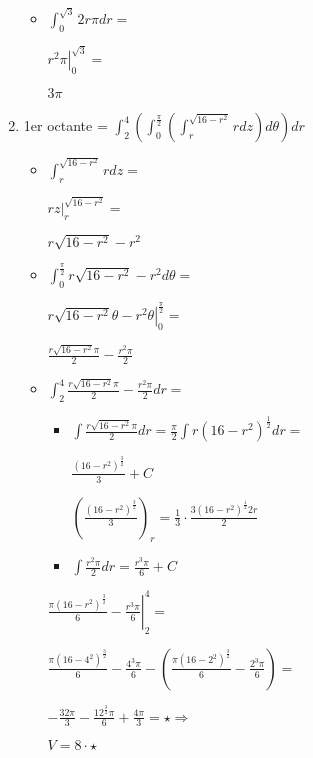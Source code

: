 \documentclass[../practica_09.tex]{subfiles}
\begin{document}
\begin{enumerate}
\begin{itemize}
                \item $\int_0^{\sqrt{3}} 2r\pi dr =$
                
                    $\left. r^2\pi \right |_0^{\sqrt{3}} =$

                    $ 3\pi $

            \end{itemize}

        \item 1er octante = $ \int_2^4 (\int_0^{\frac{\pi}{2}} (\int_r^{\sqrt{16-r^2}} r dz ) d\theta) dr $

            \begin{itemize}
                \item $ \int_r^{\sqrt{16-r^2}} r dz = $
                
                    $\left. rz \right |_r^{\sqrt{16-r^2}} = $

                    $ r\sqrt{16-r^2} - r^2 $

                \item $ \int_0^{\frac{\pi}{2}} r\sqrt{16-r^2} - r^2 d\theta = $
                
                    $\left. r\sqrt{16-r^2}\theta - r^2\theta \right |_0^{\frac{\pi}{2}} = $

                    $\frac{r\sqrt{16-r^2}\pi}{2} - \frac{r^2\pi}{2}$

                \item $\int_2^4 \frac{r\sqrt{16-r^2}\pi}{2} - \frac{r^2\pi}{2} dr = $
                
                    \begin{itemize}
                        \item $\int \frac{r\sqrt{16-r^2}\pi}{2} dr = \frac{\pi}{2} \int r(16-r^2)^{\frac{1}{2}} dr = $
                        
                            $ \frac{(16-r^2)^{\frac{3}{2}}}{3} + C$

                            $ (\frac{(16-r^2)^{\frac{3}{2}}}{3})_r = \frac{1}{3} \cdot \frac{3(16-r^2)^{\frac{1}{2}}2r}{2}$

                        \item $\int \frac{r^2\pi}{2} dr = \frac{r^3\pi}{6} + C$
                    \end{itemize}

                    $\left. \frac{\pi (16-r^2)^{\frac{3}{2}}}{6} - \frac{r^3\pi}{6} \right |_2^4 = $

                    $ \frac{\pi (16-4^2)^{\frac{3}{2}}}{6} - \frac{4^3\pi}{6} - (\frac{\pi (16-2^2)^{\frac{3}{2}}}{6} - \frac{2^3\pi}{6}) = $

                    $ - \frac{32\pi}{3} - \frac{12^{\frac{3}{2}}\pi}{6} + \frac{4\pi}{3} = \star \Rightarrow$

                    $ V = 8 \cdot \star $


            \end{itemize}

    \end{enumerate}
\end{document}
